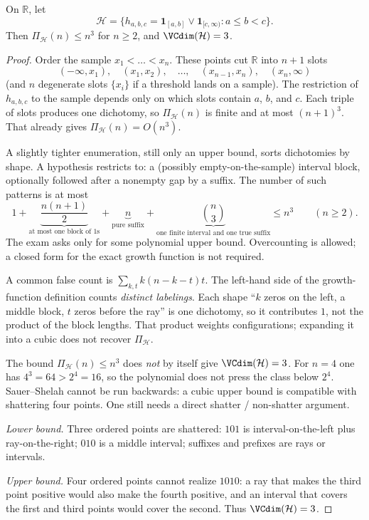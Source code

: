 \begin{proposition}
\label{prop:mlu-interval-ray}
On $\mathbb{R}$, let
\[
\mathcal{H}
=
\bigl\{
h_{a,b,c}
=
\mathbf{1}_{[a,b]}\lor\mathbf{1}_{[c,\infty)}
:
a\le b<c
\bigr\}.
\]
Then $\Pi_{\mathcal{H}}(n)\le n^3$ for $n\ge 2$, and $\VCdim(\mathcal{H})=3$.
\end{proposition}

\begin{proof}
Order the sample $x_1<\dots<x_n$. These points cut $\mathbb{R}$ into $n+1$ slots
\[
(-\infty,x_1),\quad (x_1,x_2),\quad \dots,\quad (x_{n-1},x_n),\quad (x_n,\infty)
\]
(and $n$ degenerate slots $\{x_i\}$ if a threshold lands on a sample). The restriction of $h_{a,b,c}$ to the sample depends only on which slots contain $a$, $b$, and $c$. Each triple of slots produces one dichotomy, so $\Pi_{\mathcal{H}}(n)$ is finite and at most $(n+1)^3$. That already gives $\Pi_{\mathcal{H}}(n)=O(n^3)$.

A slightly tighter enumeration, still only an upper bound, sorts dichotomies by shape. A hypothesis restricts to: a (possibly empty-on-the-sample) interval block, optionally followed after a nonempty gap by a suffix. The number of such patterns is at most
\[
1
+
\underbrace{\frac{n(n+1)}{2}}_{\text{at most one block of $1$s}}
+
\underbrace{n}_{\text{pure suffix}}
+
\underbrace{\binom{n}{3}}_{\text{one finite interval and one true suffix}}
\le
n^3
\qquad (n\ge 2).
\]
The exam asks only for some polynomial upper bound. Overcounting is allowed; a closed form for the exact growth function is not required.

A common false count is $\sum_{k,t} k(n-k-t)t$. The left-hand side of the growth-function definition counts \emph{distinct labelings}. Each shape ``$k$ zeros on the left, a middle block, $t$ zeros before the ray'' is one dichotomy, so it contributes $1$, not the product of the block lengths. That product weights configurations; expanding it into a cubic does not recover $\Pi_{\mathcal{H}}$.

The bound $\Pi_{\mathcal{H}}(n)\le n^3$ does \emph{not} by itself give $\VCdim(\mathcal{H})=3$. For $n=4$ one has $4^3=64>2^4=16$, so the polynomial does not press the class below $2^4$. Sauer--Shelah cannot be run backwards: a cubic upper bound is compatible with shattering four points. One still needs a direct shatter / non-shatter argument.

\textit{Lower bound.}
Three ordered points are shattered: $101$ is interval-on-the-left plus ray-on-the-right; $010$ is a middle interval; suffixes and prefixes are rays or intervals.

\textit{Upper bound.}
Four ordered points cannot realize $1010$: a ray that makes the third point positive would also make the fourth positive, and an interval that covers the first and third points would cover the second. Thus $\VCdim(\mathcal{H})=3$.
\end{proof}

